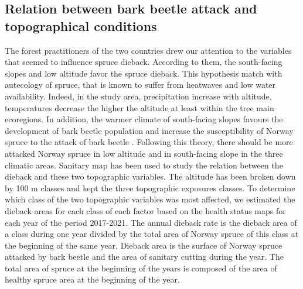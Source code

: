 \documentclass[3p,procedia]{elsarticle}
\begin{document}
\subsection{Relation between bark beetle attack and topographical conditions}

The forest practitioners of the two countries drew our attention to the variables that seemed to influence spruce dieback.
According to them, the south-facing slopes and low altitude favor the spruce dieback.
This hypothesis match with autecology of spruce, that is known to suffer from heatwaves and low water availability.
Indeed, in the study area, precipitation increase with altitude, temperatures decrease the higher the altitude at least within the tree main ecoregions.
In addition, the warmer climate of south-facing slopes favours the development of bark beetle population \citep{annila_influence_1969, baier_phenipscomprehensive_2007, jonsson_2009, marini_climate_2012} and increase the susceptibility of Norway spruce to the attack of bark beetle \citep{wermelinger_ecology_2004, netherer_waterlimiting_2015}.
Following this theory, there should be more attacked Norway spruce in low altitude and in south-facing slope in the three climatic areas.  
Sanitary map has been used to study the relation between the dieback and these two topographic variables.
The altitude has been broken down  by 100 m classes and kept the three topographic exposures classes.
To determine which class of the two topographic variables was most affected, we estimated the dieback areas for each class of each factor based on the health status maps for each year of the period 2017-2021.
The  annual dieback rate is  the dieback area of a class during one year divided by the total area of Norway spruce of this class at the beginning of the same year. 
Dieback area is the surface of Norway spruce attacked by bark beetle and the area of sanitary cutting during the year. 
The total area of spruce at the beginning of the years is composed of the area of healthy spruce area at the beginning of the year. 





  
			
\end{document}
